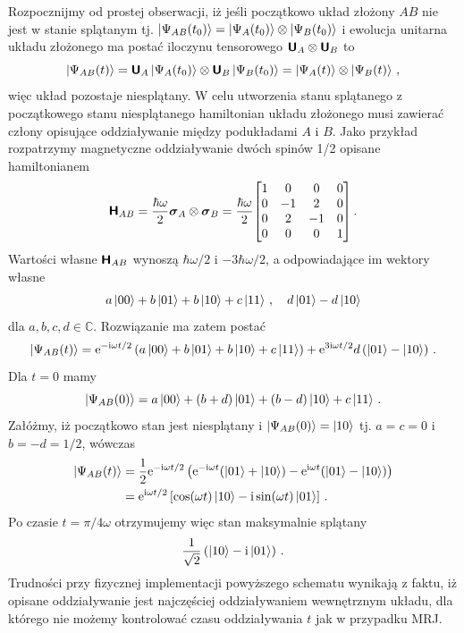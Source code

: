 \documentclass{myclass}
\begin{document}
Rozpocznijmy od prostej obserwacji, iż jeśli początkowo układ złożony \(AB\) nie jest w stanie
splątanym tj. \(\ket{\Psi_{AB}(t_0)} = \ket{\Psi_A(t_0)} \otimes \ket{\Psi_B(t_0)}\) i ewolucja
unitarna układu złożonego ma postać iloczynu tensorowego \(\boldsymbol{\mathsf{U}}_A\otimes\boldsymbol{\mathsf{U}}_B\) to
\begin{equation*}
    \ket{\Psi_{AB}(t)} = \boldsymbol{\mathsf{U}}_A\ket{\Psi_A(t_0)} \otimes \boldsymbol{\mathsf{U}}_B\ket{\Psi_B(t_0)} = \ket{\Psi_A(t)} \otimes \ket{\Psi_B(t)}\,,
\end{equation*}
więc układ pozostaje niesplątany. W celu utworzenia stanu splątanego z początkowego stanu
niesplątanego hamiltonian układu złożonego musi zawierać człony opisujące oddziaływanie między
podukładami \(A\) i \(B\). Jako przykład rozpatrzymy magnetyczne oddziaływanie dwóch spinów 1/2
opisane hamiltonianem
\begin{equation*}
    \oper{H}_{AB} = \frac{\hbar\omega}{2}\oper{\sigma}_A \otimes \oper{\sigma}_B = \frac{\hbar\omega}{2}\mqty[1 & 0 & 0 & 0 \\ 0 & -1 & 2 & 0 \\ 0 & 2 & -1 & 0 \\ 0 & 0 & 0 & 1]\,.
\end{equation*}
Wartości własne \(\boldsymbol{\mathsf{H}}_{AB}\) wynoszą \(\hbar\omega/2\) i \(-3\hbar\omega/2\), a odpowiadające
im wektory własne
\begin{equation*}
    \begin{split}
        a \ket{00} + b \ket{01} + b \ket{10} + c\ket{11}\,,\quad d \ket{01} - d \ket{10}
    \end{split}
\end{equation*}
dla \(a,b,c,d\in\mathbb{C}\). Rozwiązanie ma zatem postać
\begin{equation*}
    \ket{\Psi_{AB}(t)} = \mathrm{e}^{-\mathrm{i}\omega t/2}\left(a \ket{00} + b \ket{01} + b \ket{10} + c\ket{11}\right) + \mathrm{e}^{3\mathrm{i}\omega t/2}d\left(\ket{01} - \ket{10}\right)\,.
\end{equation*}
Dla \(t=0\) mamy
\begin{equation*}
    \ket{\Psi_{AB}(0)} = a\ket{00} + (b+d)\ket{01} + (b-d)\ket{10} + c\ket{11}\,.
\end{equation*}
Załóżmy, iż początkowo stan jest niesplątany i \(\ket{\Psi_{AB}(0)} = \ket{10}\) tj. \(a=c=0\) i \(b
= -d = 1/2\), wówczas
\begin{equation*}
    \begin{split}
        \ket{\Psi_{AB}(t)} &= \frac{1}{2}\mathrm{e}^{-\mathrm{i}\omega t/2}\left(\mathrm{e}^{-\mathrm{i}\omega t}(\ket{01} + \ket{10}) - \mathrm{e}^{\mathrm{i}\omega t}(\ket{01} - \ket{10})\right) \\
        &= \mathrm{e}^{\mathrm{i}\omega t/2}\left[\cos(\omega t)\ket{10} - \mathrm{i}\sin(\omega t)\ket{01}\right]\,.
    \end{split}
\end{equation*}
Po czasie \(t = \pi/4\omega\) otrzymujemy więc stan maksymalnie splątany
\begin{equation*}
    \frac{1}{\sqrt{2}}\left(\ket{10} - \mathrm{i}\ket{01}\right)\,.
\end{equation*}
Trudności przy fizycznej implementacji powyższego schematu wynikają z faktu, iż opisane
oddziaływanie jest najczęściej oddziaływaniem wewnętrznym układu, dla którego nie możemy kontrolować
czasu oddziaływania \(t\) jak w przypadku MRJ.
\end{document}
